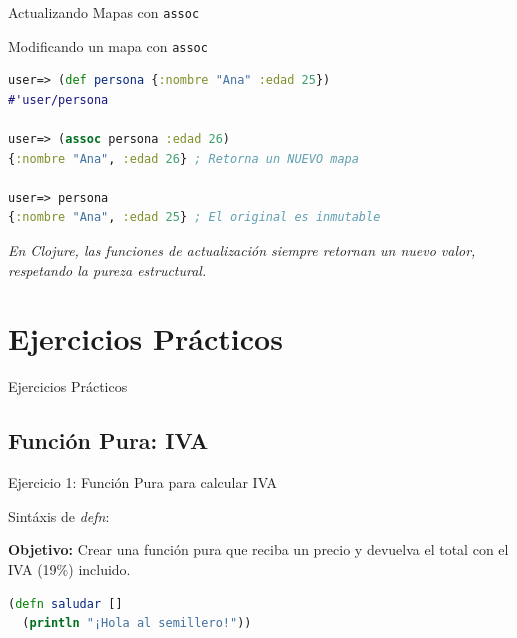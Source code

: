 \documentclass{beamer}
\begin{document}
\begin{frame}[fragile]{Actualizando Mapas con \texttt{assoc}}
    \begin{exampleblock}{Modificando un mapa con \texttt{assoc}}
        \begin{lstlisting}[language=Clojure]
user=> (def persona {:nombre "Ana" :edad 25})
#'user/persona

user=> (assoc persona :edad 26)
{:nombre "Ana", :edad 26} ; Retorna un NUEVO mapa

user=> persona
{:nombre "Ana", :edad 25} ; El original es inmutable
        \end{lstlisting}
    \end{exampleblock}
    
    \vspace{0.3cm}
    \begin{center}
        \textit{En Clojure, las funciones de actualización siempre retornan un nuevo valor, respetando la pureza estructural.}
    \end{center}
\end{frame}

\section{Ejercicios Prácticos}

\begin{emptyframe}
    Ejercicios Prácticos
\end{emptyframe}

\subsection{Función Pura: IVA}

\begin{frame}[fragile]{Ejercicio 1: Función Pura para calcular IVA}
    
    Sintáxis de \textit{defn}:
    
    \textbf{Objetivo:} Crear una función pura que reciba un precio y devuelva el total con el IVA (19\%) incluido.

            \begin{lstlisting}[language=Clojure]
(defn saludar []
  (println "¡Hola al semillero!"))
    \end{lstlisting}    
    
\end{frame}
\end{document}
